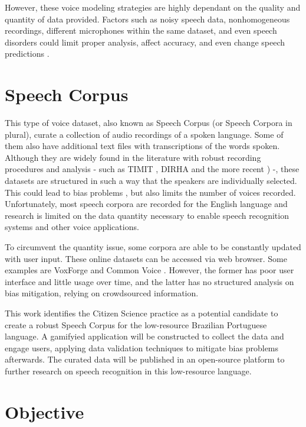 However, these voice modeling strategies are highly dependant on the quality and quantity of data provided. Factors such as noisy speech data, nonhomogeneous recordings, different microphones within the same dataset, and even speech disorders could limit proper analysis, affect accuracy, and even change speech predictions \cite{cooke2001robust}. 

\section*{Speech Corpus}

This type of voice dataset, also known as Speech Corpus (or Speech Corpora in plural), curate a collection of audio recordings of a spoken language. Some of them also have additional text files with transcriptions of the words spoken. Although they are widely found in the literature with robust recording procedures and analysis - such as TIMIT \cite{Lamel1992timmit}, DIRHA \cite{Ravanelli2016dirha} and the more recent \cite{chanchaochai2018globaltimit}) -, these datasets are structured in such a way that the speakers are individually selected. This could lead to bias problems \cite{bender2018data}, but also limits the number of voices recorded. Unfortunately, most speech corpora are recorded for the English language \cite{LeRouxVincent2014TRdatasets} and research is limited on the data quantity necessary to enable speech recognition systems and other voice applications.

To circumvent the quantity issue, some corpora are able to be constantly updated with user input. These online datasets can be accessed via web browser. Some examples are VoxForge and Common Voice \cite{ardila2019common}. However, the former has poor user interface and little usage over time, and the latter has no structured analysis on bias mitigation, relying on crowdsourced information.

This work identifies the Citizen Science practice as a potential candidate to create a robust Speech Corpus for the low-resource Brazilian Portuguese language. A gamifyied application will be constructed to collect the data and engage users, applying data validation techniques to mitigate bias problems afterwards. The curated data will be published in an open-source platform to further research on speech recognition in this low-resource language.

\section*{Objective}

